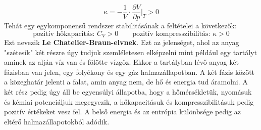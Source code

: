 \documentclass[a4paper,12pt]{article}
\begin{document}
\begin{equation}
    \kappa = - \frac{1}{V} \cdot \frac{\partial V}{\partial p}\bigg|_{T} > 0
\end{equation}
Tehát egy egykomponensű rendszer stabilitásának a feltételei a következők:
\begin{equation}
    \boxed{\text{pozitív hőkapacitás: } C_{V} > 0 \qquad \text{pozitív kompresszibilitás: } \kappa > 0}
\end{equation}
Ezt nevezik \textbf{Le Chatelier-Braun-elvnek}. 
\newline
\newline
Ezt az jelenséget, ahol az anyag "szétesik" két részre úgy tudjuk szemléletesen elképzelni mint például egy tartályt aminek az alján víz van és fölötte vízgőz.
Ekkor a tartályban lévő anyag két fázisban van jelen, egy folyékony és egy gáz halmazállapotban. A két fázis között a közeghatár jelenti a falat, amin anyag nem,
de hő és energia tud áramolni. A két rész pedig úgy áll be egyensúlyi állapotba, hogy a hőmérsékletük, nyomásuk és kémiai potenciáljuk megegyezik, 
a hőkapacitásuk és kompresszibilitásuk pedig pozitív értékeket vesz fel. A belső energia és az entrópia különbsége pedig az eltérő halmazállapotokból adódik.
\end{document}
